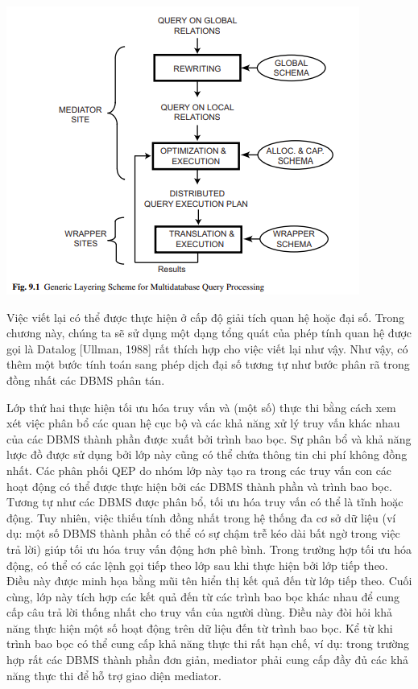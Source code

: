 \documentclass[a4paper]{article}
\begin{document}
\includegraphics[width=0.8\linewidth]{image/3/9.1}

Việc viết lại có thể được thực hiện ở cấp độ giải tích quan hệ hoặc đại số. Trong chương này,
chúng ta sẽ sử dụng một dạng tổng quát của phép tính quan hệ được gọi là Datalog [Ullman, 1988]
rất thích hợp cho việc viết lại như vậy. Như vậy, có thêm một bước tính toán
sang phép dịch đại số tương tự như bước phân rã trong đồng nhất
các DBMS phân tán.

Lớp thứ hai thực hiện tối ưu hóa truy vấn và (một số) thực thi bằng cách xem xét việc phân bổ các quan hệ cục bộ và các khả năng xử lý truy vấn khác nhau
của các DBMS thành phần được xuất bởi trình bao bọc. Sự phân bổ và khả năng
lược đồ được sử dụng bởi lớp này cũng có thể chứa thông tin chi phí không đồng nhất. Các
phân phối QEP do nhóm lớp này tạo ra trong các truy vấn con các hoạt động
có thể được thực hiện bởi các DBMS thành phần và trình bao bọc. Tương tự như các DBMS được phân bổ, tối ưu hóa truy vấn có thể là tĩnh hoặc động. Tuy nhiên, việc thiếu
tính đồng nhất trong hệ thống đa cơ sở dữ liệu (ví dụ: một số DBMS thành phần có thể có
sự chậm trễ kéo dài bất ngờ trong việc trả lời) giúp tối ưu hóa truy vấn động hơn
phê bình. Trong trường hợp tối ưu hóa động, có thể có các lệnh gọi tiếp theo
lớp sau khi thực hiện bởi lớp tiếp theo. Điều này được minh họa bằng mũi tên hiển thị kết quả
đến từ lớp tiếp theo. Cuối cùng, lớp này tích hợp các kết quả đến từ các trình bao bọc khác nhau để cung cấp câu trả lời thống nhất cho truy vấn của người dùng. Điều này đòi hỏi
khả năng thực hiện một số hoạt động trên dữ liệu đến từ trình bao bọc. Kể từ khi
trình bao bọc có thể cung cấp khả năng thực thi rất hạn chế, ví dụ: trong trường hợp rất
các DBMS thành phần đơn giản, mediator phải cung cấp đầy đủ các khả năng thực thi
để hỗ trợ giao diện mediator.
\end{document}
